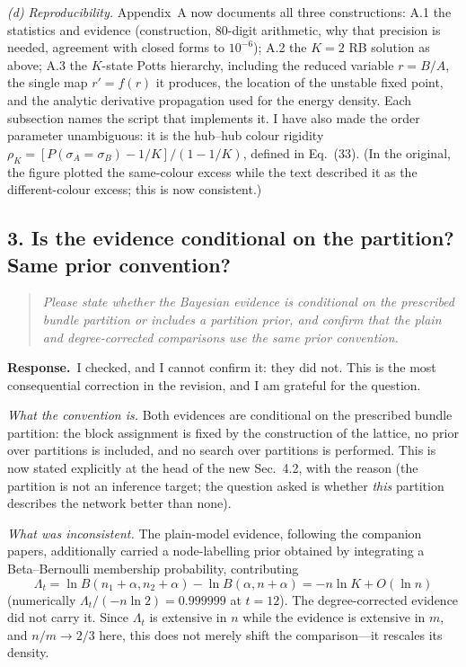 \documentclass[11pt]{article}
\newenvironment{point}{\begin{quote}\itshape}{\end{quote}}
\newcommand{\reply}{\par\noindent\textbf{Response.}\ }
\begin{document}
\emph{(d) Reproducibility.} Appendix~A now documents all three constructions:
A.1 the statistics and evidence (construction, $80$-digit arithmetic, why that
precision is needed, agreement with closed forms to $10^{-6}$); A.2 the $K=2$
RB solution as above; A.3 the $K$-state Potts hierarchy, including the reduced
variable $r=B/A$, the single map $r'=f(r)$ it produces, the location of the
unstable fixed point, and the analytic derivative propagation used for the
energy density. Each subsection names the script that implements it. I have
also made the order parameter unambiguous: it is the hub--hub colour rigidity
$\rho_K=[P(\sigma_A=\sigma_B)-1/K]/(1-1/K)$, defined in Eq.~(33). (In the
original, the figure plotted the same-colour excess while the text described it
as the different-colour excess; this is now consistent.)

\subsection*{3. Is the evidence conditional on the partition? Same prior convention?}

\begin{point}
Please state whether the Bayesian evidence is conditional on the prescribed
bundle partition or includes a partition prior, and confirm that the plain and
degree-corrected comparisons use the same prior convention.
\end{point}

\reply I checked, and I cannot confirm it: they did not. This is the most
consequential correction in the revision, and I am grateful for the question.

\emph{What the convention is.} Both evidences are conditional on the prescribed
bundle partition: the block assignment is fixed by the construction of the
lattice, no prior over partitions is included, and no search over partitions is
performed. This is now stated explicitly at the head of the new Sec.~4.2, with
the reason (the partition is not an inference target; the question asked is
whether \emph{this} partition describes the network better than none).

\emph{What was inconsistent.} The plain-model evidence, following the companion
papers, additionally carried a node-labelling prior obtained by integrating a
Beta--Bernoulli membership probability, contributing
\[
  \Lambda_t=\ln B(n_1{+}\alpha,n_2{+}\alpha)-\ln B(\alpha,n{+}\alpha)
           =-n\ln K+O(\ln n)
\]
(numerically $\Lambda_t/(-n\ln2)=0.999999$ at $t=12$). The degree-corrected
evidence did not carry it. Since $\Lambda_t$ is extensive in $n$ while the
evidence is extensive in $m$, and $n/m\to2/3$ here, this does not merely shift
the comparison---it rescales its density.
\end{document}
